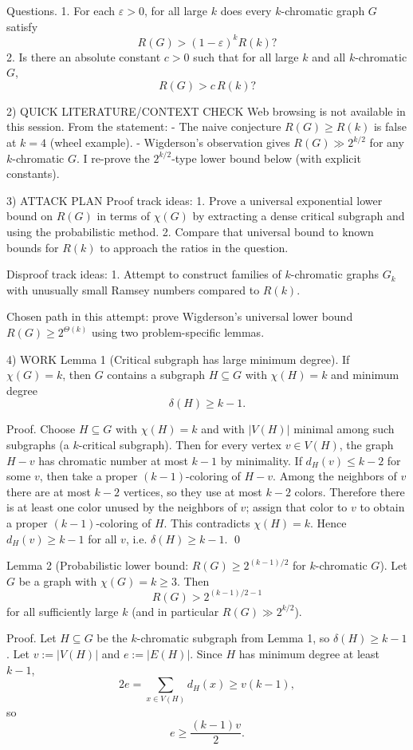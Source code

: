 Questions.
1. For each $\varepsilon>0$, for all large $k$ does every $k$-chromatic graph $G$ satisfy
\[R(G)>(1-\varepsilon)^k R(k)?\]
2. Is there an absolute constant $c>0$ such that for all large $k$ and all $k$-chromatic $G$,
\[R(G)>c\,R(k)?\]

2) QUICK LITERATURE/CONTEXT CHECK
Web browsing is not available in this session.
From the statement:
- The naive conjecture $R(G)\ge R(k)$ is false at $k=4$ (wheel example).
- Wigderson's observation gives $R(G)\gg 2^{k/2}$ for any $k$-chromatic $G$.
I re-prove the $2^{k/2}$-type lower bound below (with explicit constants).

3) ATTACK PLAN
Proof track ideas:
1. Prove a universal exponential lower bound on $R(G)$ in terms of $\chi(G)$ by extracting a dense critical subgraph and using the probabilistic method.
2. Compare that universal bound to known bounds for $R(k)$ to approach the ratios in the question.

Disproof track ideas:
1. Attempt to construct families of $k$-chromatic graphs $G_k$ with unusually small Ramsey numbers compared to $R(k)$.

Chosen path in this attempt: prove Wigderson's universal lower bound $R(G)\ge 2^{\Theta(k)}$ using two problem-specific lemmas.

4) WORK
Lemma 1 (Critical subgraph has large minimum degree).
If $\chi(G)=k$, then $G$ contains a subgraph $H\subseteq G$ with $\chi(H)=k$ and minimum degree
\[\delta(H)\ge k-1.\]

Proof.
Choose $H\subseteq G$ with $\chi(H)=k$ and with $|V(H)|$ minimal among such subgraphs (a $k$-critical subgraph).
Then for every vertex $v\in V(H)$, the graph $H-v$ has chromatic number at most $k-1$ by minimality.
If $d_H(v)\le k-2$ for some $v$, then take a proper $(k-1)$-coloring of $H-v$.
Among the neighbors of $v$ there are at most $k-2$ vertices, so they use at most $k-2$ colors.
Therefore there is at least one color unused by the neighbors of $v$; assign that color to $v$ to obtain a proper $(k-1)$-coloring of $H$.
This contradicts $\chi(H)=k$.
Hence $d_H(v)\ge k-1$ for all $v$, i.e. $\delta(H)\ge k-1$. \qed

Lemma 2 (Probabilistic lower bound: $R(G)\ge 2^{(k-1)/2}$ for $k$-chromatic $G$).
Let $G$ be a graph with $\chi(G)=k\ge 3$.
Then
\[R(G) > 2^{(k-1)/2-1}\]
for all sufficiently large $k$ (and in particular $R(G)\gg 2^{k/2}$).

Proof.
Let $H\subseteq G$ be the $k$-chromatic subgraph from Lemma 1, so $\delta(H)\ge k-1$.
Let $v:=|V(H)|$ and $e:=|E(H)|$.
Since $H$ has minimum degree at least $k-1$,
\[2e=\sum_{x\in V(H)} d_H(x)\ge v(k-1),\]
so
\[e\ge \frac{(k-1)v}{2}.\tag{1}\]

